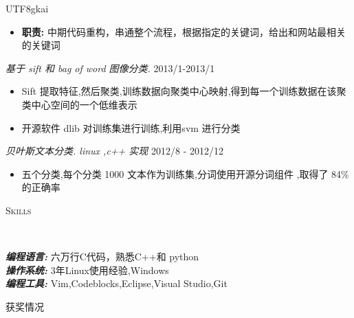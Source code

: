 \documentclass[9pt]{article}
\newenvironment{changemargin}[2]{%
  \begin{list}{}{%
    \setlength{\topsep}{0pt}%
    \setlength{\leftmargin}{#1}%
    \setlength{\rightmargin}{#2}%
    \setlength{\listparindent}{\parindent}%
    \setlength{\itemindent}{\parindent}%
    \setlength{\parsep}{\parskip}%
  }%
  \item[]}{\end{list}
}
\newcommand{\lineover}{
	\begin{changemargin}{-0.05in}{-0.05in}
		\vspace*{-8pt}
		\hrulefill \\
		\vspace*{-2pt}
	\end{changemargin}
}
\newcommand{\header}[1]{
	\begin{changemargin}{-0.5in}{-0.5in}
		\scshape{#1}\\
  	\lineover
	\end{changemargin}
}
\newenvironment{body} {
	\vspace*{-16pt}
	\begin{changemargin}{-0.25in}{-0.5in}
  }	
	{\end{changemargin}
}
\begin{document}
\begin{CJK}{UTF8}{gkai}
\begin{body}
\begin{itemize}
		\item {\textbf{职责:}}{}   中期代码重构，串通整个流程，根据指定的关键词，给出和网站最相关的关键词
	\end{itemize}
	
 	\emph{基于 sift 和 bag of word 图像分类.} \hfill {2013/1-2013/1}\\
 	\vspace*{-4pt}
	\begin{itemize} \itemsep -0pt
		\item  Sift 提取特征,然后聚类,训练数据向聚类中心映射,得到每一个训练数据在该聚类中心空间的一个低维表示
		\item 开源软件 dlib 对训练集进行训练,利用svm 进行分类 
	\end{itemize}
	\emph{贝叶斯文本分类. linux ,c++ 实现} \hfill {2012/8 - 2012/12}\\
	\vspace*{-4pt}
	\begin{itemize} \itemsep -0pt
		\item {} 五个分类,每个分类 1000 文本作为训练集,分词使用开源分词组件 ,取得了 84\%的正确率
	\end{itemize}


\end{body}

\smallskip

\header{Skills}

\begin{body}
	\vspace{14pt}
	\emph{\textbf{编程语言:}}{} 六万行C代码，熟悉C++和 python \\
	\medskip
	\emph{\textbf{操作系统:}}{} 3年Linux使用经验,Windows \\
	\medskip
	\emph{\textbf{编程工具:}}{} Vim,Codeblocks,Eclipse,Visual Studio,Git \\
\end{body}

\smallskip



\header{获奖情况}


\end{CJK}
\end{document}
